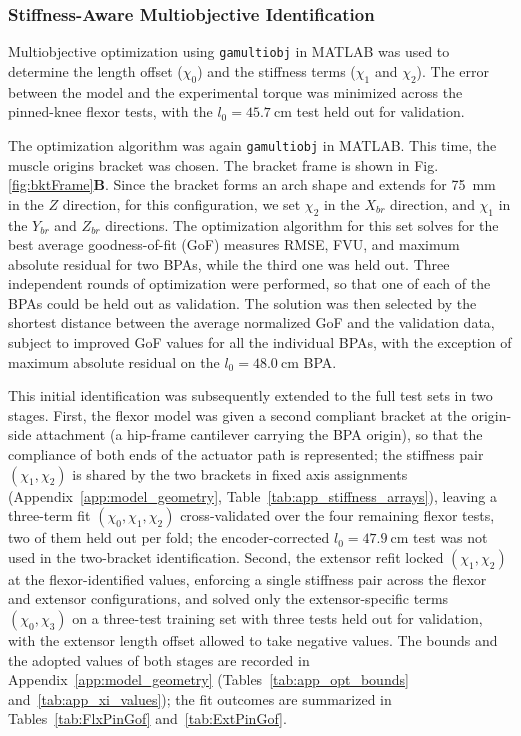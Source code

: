 \subsubsection{Stiffness-Aware Multiobjective Identification}\label{sec:identification}

Multiobjective optimization using \texttt{gamultiobj} in MATLAB was used to determine the length offset ($\chi_{0}$) and the stiffness terms ($\chi_{1}$ and $\chi_{2}$). The error between the model and the experimental torque was minimized across the pinned-knee flexor tests, with the $l_{0}=\qty{45.7}{\cm}$ test held out for validation.

The optimization algorithm was again \texttt{gamultiobj} in MATLAB. This time, the muscle origins bracket was chosen. The bracket frame is shown in Fig. \ref{fig:bktFrame}\textbf{B}. Since the bracket forms an arch shape and extends for \qty{75}{\mm} in the $Z$ direction, for this configuration, we set $\chi_{2}$ in the $X_{br}$ direction, and $\chi_{1}$ in the $Y_{br}$ and $Z_{br}$ directions. The optimization algorithm for this set solves for the best average goodness-of-fit (GoF) measures RMSE, FVU, and maximum absolute residual for two BPAs, while the third one was held out. Three independent rounds of optimization were performed, so that one of each of the BPAs could be held out as validation. The solution was then selected by the shortest distance between the average normalized GoF and the validation data, subject to improved GoF values for all the individual BPAs, with the exception of maximum absolute residual on the $l_{0}=\qty{48.0}{\cm}$ BPA.

This initial identification was subsequently extended to the full test sets in two stages. First, the flexor model was given a second compliant bracket at the origin-side attachment (a hip-frame cantilever carrying the BPA origin), so that the compliance of both ends of the actuator path is represented; the stiffness pair $(\chi_{1}, \chi_{2})$ is shared by the two brackets in fixed axis assignments (Appendix~\ref{app:model_geometry}, Table~\ref{tab:app_stiffness_arrays}), leaving a three-term fit $(\chi_{0}, \chi_{1}, \chi_{2})$ cross-validated over the four remaining flexor tests, two of them held out per fold; the encoder-corrected $l_{0}=\qty{47.9}{\cm}$ test was not used in the two-bracket identification. Second, the extensor refit locked $(\chi_{1}, \chi_{2})$ at the flexor-identified values, enforcing a single stiffness pair across the flexor and extensor configurations, and solved only the extensor-specific terms $(\chi_{0}, \chi_{3})$ on a three-test training set with three tests held out for validation, with the extensor length offset allowed to take negative values. The bounds and the adopted values of both stages are recorded in Appendix~\ref{app:model_geometry} (Tables~\ref{tab:app_opt_bounds} and~\ref{tab:app_xi_values}); the fit outcomes are summarized in Tables~\ref{tab:FlxPinGof} and~\ref{tab:ExtPinGof}.

